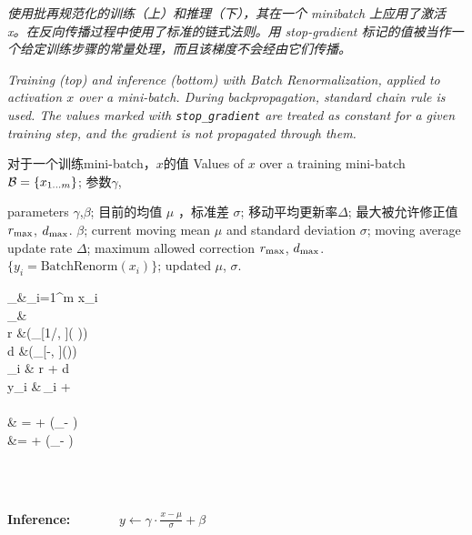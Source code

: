\begin{algorithm}[t]
  \caption{\em 使用批再规范化的训练（上）和推理（下），其在一个 minibatch 上应用了激活 x。在反向传播过程中使用了标准的链式法则。用 stop-gradient 标记的值被当作一个给定训练步骤的常量处理，而且该梯度不会经由它们传播。
  }
  \caption{\em Training (top) and inference (bottom) with Batch Renormalization, applied to activation $x$ over a mini-batch. During backpropagation, standard chain rule is used.
  The values marked with \texttt{stop\_gradient} are treated as constant for a given training step, and the gradient is not propagated through them.
  }
\label{alg-bn}
  \begin{algorithmic}
  \REQUIRE
  对于一个训练mini-batch，$x$的值
  Values of $x$ over a training mini-batch
  $\mathcal{B}=\{x_{1\ldots m}\}$;
  参数$\gamma$,

 parameters $\gamma$,$\beta$; 目前的均值 $\mu$ ，标准差 $\sigma$; 移动平均更新率$\Delta$; 最大被允许修正值 $r_{\text{max}}$, $d_{\text{max}}$.
    $\beta$; current moving mean $\mu$ and standard deviation $\sigma$; moving average update rate $\Delta$; maximum allowed correction $r_{\text{max}}$, $d_{\text{max}}$.
  \ENSURE $\{y_i =  \text{BatchRenorm}(x_i)\}$; updated $\mu$, $\sigma$.
  \begin{flalign*}
      \mu_\setB &\leftarrow  {}\sum_{i=1}^m x_i \\
  \sigma_\setB &\leftarrow  {}
\\
  r &\leftarrow {}\left(_{[1/\rmax, \rmax]}\left( \frac{\sigma_\setB}{\sigma}\right)\right) \\
  d &\leftarrow  {}\left(_{[-\dmax, \dmax]}\left(\frac{\mu_\setB-\mu}{\sigma}\right)\right)
  \\
\xhat_i &\leftarrow {} \cdot r + d
\\
  y_i &\leftarrow \gamma\,\xhat_i + \beta   \\
  \\
  \mu & \mathrel{:}= \mu + \Delta (\mu_\setB - \mu) \hspace{0.2in} \\
  \sigma &\mathrel{:}=  \sigma + \Delta (\sigma_\setB - \sigma)
  \end{flalign*}
  \hspace{-.1in}\hrulefill\hspace{.03in}\\
  \vspace{-0.1in}
    \hspace{-.1in}\hrulefill\hspace{.03in}\\
  \vspace{.2in}
  \item[\textbf{Inference:}]\ \ \ \ \ \ \
  $\displaystyle y\leftarrow \gamma\cdot \frac{x-\mu}{\sigma} + \beta$
    \vspace{.1in}
\end{algorithmic}
\end{algorithm}

